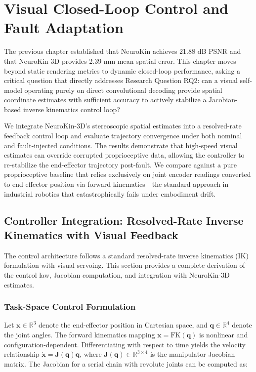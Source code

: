 \documentclass[12pt,a4paper,oneside]{report}
\begin{document}
\chapter{Visual Closed-Loop Control and Fault Adaptation}
\label{chap:closed_loop_fault_adaptation}

The previous chapter established that NeuroKin achieves 21.88 dB PSNR and that NeuroKin-3D provides 2.39 mm mean spatial error. This chapter moves beyond static rendering metrics to dynamic closed-loop performance, asking a critical question that directly addresses Research Question RQ2: can a visual self-model operating purely on direct convolutional decoding provide spatial coordinate estimates with sufficient accuracy to actively stabilize a Jacobian-based inverse kinematics control loop?

We integrate NeuroKin-3D's stereoscopic spatial estimates into a resolved-rate feedback control loop and evaluate trajectory convergence under both nominal and fault-injected conditions. The results demonstrate that high-speed visual estimates can override corrupted proprioceptive data, allowing the controller to re-stabilize the end-effector trajectory post-fault. We compare against a pure proprioceptive baseline that relies exclusively on joint encoder readings converted to end-effector position via forward kinematics—the standard approach in industrial robotics that catastrophically fails under embodiment drift.

\section{Controller Integration: Resolved-Rate Inverse Kinematics with Visual Feedback}

The control architecture follows a standard resolved-rate inverse kinematics (IK) formulation with visual servoing. This section provides a complete derivation of the control law, Jacobian computation, and integration with NeuroKin-3D estimates.

\subsection{Task-Space Control Formulation}
\label{subsec:task_space_control_formulation}

Let $\mathbf{x} \in \mathbb{R}^3$ denote the end-effector position in Cartesian space, and $\mathbf{q} \in \mathbb{R}^4$ denote the joint angles. The forward kinematics mapping $\mathbf{x} = \text{FK}(\mathbf{q})$ is nonlinear and configuration-dependent. Differentiating with respect to time yields the velocity relationship $\dot{\mathbf{x}} = \mathbf{J}(\mathbf{q}) \dot{\mathbf{q}}$, where $\mathbf{J}(\mathbf{q}) \in \mathbb{R}^{3 \times 4}$ is the manipulator Jacobian matrix. The Jacobian for a serial chain with revolute joints can be computed as:
\end{document}
